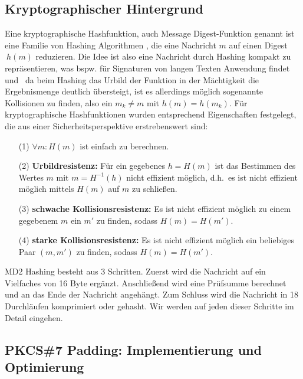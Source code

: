 \subsection{Kryptographischer Hintergrund}
\label{sec:crypto}

Eine kryptographische Hashfunktion, auch \glqq Message Digest\grqq -Funktion genannt ist
eine Familie von Hashing Algorithmen
, die eine Nachricht $m$ auf einen \glqq Digest\grqq $\ h(m)$ reduzieren.
Die Idee ist also
eine Nachricht durch Hashing kompakt zu repräsentieren, was bspw.
für Signaturen
von langen Texten Anwendung findet~\cite{menezes2018} und \
da beim Hashing  das Urbild der Funktion in der Mächtigkeit die Ergebnismenge deutlich
übersteigt, ist es allerdings möglich sogenannte Kollisionen zu finden, also ein
$m_k \ne m$ mit $h(m) = h(m_k)$.
Für kryptographische Hashfunktionen wurden
entsprechend Eigenschaften festgelegt, die aus einer Sicherheitsperspektive
erstrebenswert sind:\cite{kryptografischeHashfunktion}

\begin{itemize}
      \item [(1)] $\forall m:  H(m)$ ist einfach zu berechnen.
      \item [(2)] \textbf{Urbildresistenz:} Für ein gegebenes $h = H(m)$ ist das Bestimmen des
            Wertes $m$ mit $m = H^{-1}(h)$ nicht effizient möglich, d.h.\ es ist nicht effizient
            möglich mittels $H(m)$ auf $m$ zu schließen.
      \item [(3)] \textbf{schwache Kollisionsresistenz:} Es ist nicht effizient möglich zu einem
            gegebenem $m$ ein $m'$ zu finden, sodass $H(m) = H(m')$.
      \item [(4)] \textbf{starke Kollisionsresistenz:} Es ist nicht effizient möglich ein
            beliebiges Paar $(m, m')$ zu finden, sodass $H(m) = H(m')$.
\end{itemize}

MD2 Hashing besteht aus 3 Schritten. Zuerst wird die Nachricht auf ein
Vielfaches von 16 Byte ergänzt. Anschließend wird eine Prüfsumme berechnet und 
an das Ende der Nachricht angehängt. Zum Schluss wird die Nachricht in 18 
Durchläufen komprimiert oder gehasht. 
Wir werden auf jeden dieser Schritte im Detail eingehen. 

\subsection{PKCS\#7 Padding: Implementierung und Optimierung}

